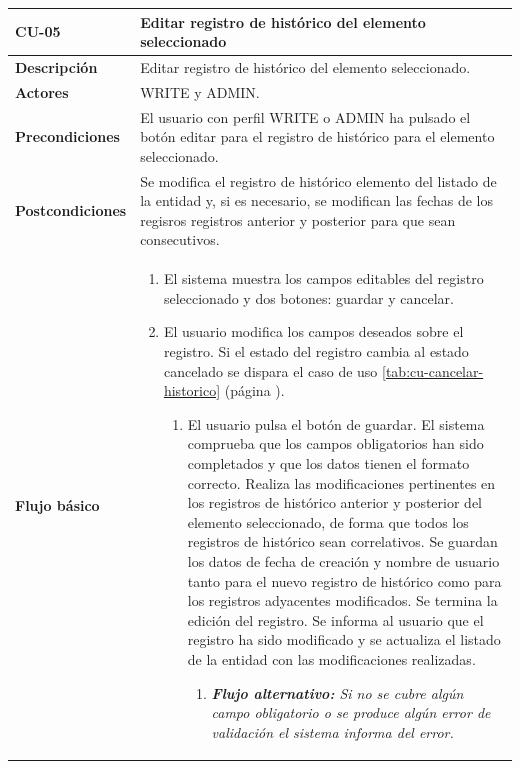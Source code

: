 \begin{table} [H]
    \centering
    \setlength{\leftmargini}{0.4cm}
	\resizebox{14cm}{!} { %
    \begin{tabular}{| m{3cm} | m{11cm} |}   
    \hline
	  \textbf{CU-05} & \textbf{Editar registro de histórico del elemento seleccionado} \\\hline
	  \textbf{Descripción} & Editar registro de histórico del elemento seleccionado. \\\hline
	  \textbf{Actores} & WRITE y ADMIN. \\\hline
	  \textbf{Precondiciones} & El usuario con perfil WRITE o ADMIN ha pulsado el botón editar para el registro de histórico para el elemento seleccionado. \\\hline
	  \textbf{Postcondiciones} & Se modifica el registro de histórico elemento del listado de la entidad  y, si es necesario, se modifican las fechas de los regisros registros anterior y posterior para que sean consecutivos. \\\hline
	  \textbf{Flujo básico} & 
		\begin{enumerate}
	  	\item El sistema muestra los campos editables del registro seleccionado y dos botones: guardar y cancelar.
        \item El usuario modifica los campos deseados sobre el registro. Si el estado del registro cambia al estado cancelado se dispara el caso de uso \ref{tab:cu-cancelar-historico} (página \pageref{tab:cu-cancelar-historico}).
			\begin{enumerate}	
			   \item El usuario pulsa el botón de guardar. El sistema comprueba que los campos obligatorios han sido completados y que los datos tienen el formato correcto. Realiza las modificaciones pertinentes en los registros de histórico anterior y posterior del elemento seleccionado, de forma que todos los registros de histórico sean correlativos. Se guardan los datos de fecha de creación y nombre de usuario tanto para el nuevo registro de histórico como para los registros adyacentes modificados. Se termina la edición del registro. Se informa al usuario que el registro ha sido modificado y se actualiza el listado de la entidad con las modificaciones realizadas.
			   \begin{enumerate}	
			   \item  \textit{\textbf{Flujo alternativo:} Si no se cubre algún campo obligatorio o se produce algún error de validación el sistema informa del error.}

\end{enumerate}
\end{enumerate}
\end{enumerate}
\end{tabular}}
\end{table}
